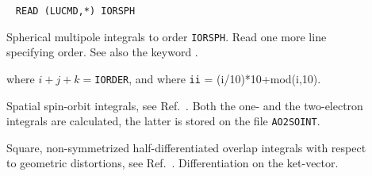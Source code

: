 \begin{description}
\item[]\verb| |\newline
\verb|READ (LUCMD,*) IORSPH|

Spherical multipole integrals to order
\verb|IORSPH|. Read one more
line specifying order. See also the keyword .

where $i+j+k =$\verb|IORDER|, and where \verb|ii| = (i/10)*10+mod(i,10).

\item[] Spatial spin-orbit
integrals, see Ref.~\cite{ovhapjhjajthjojcp96}. Both the one- and the
two-electron integrals are calculated, the latter is stored on the file
\verb|AO2SOINT|.


%

\item[] Square, non-symmetrized half-differentiated
overlap integrals with respect to geometric distortions, see
Ref.~\cite{klbpjhjajjothjcp97}. Differentiation on the ket-vector.


\end{description}
